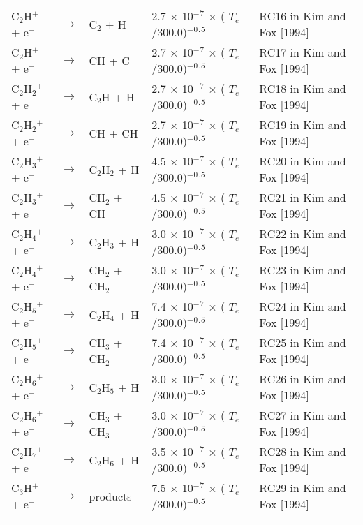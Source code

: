 \documentclass[10pt,a4paper]{jarticle}
\begin{document}
\begin{table}[htb]
{\begin{tabular}{lclll}
 C$_2$H$^+$  + e$^-$ & $\rightarrow$ & C$_2$   +  H       & 2.7 $\times$ 10$^-$$^7$ $\times$ ( $T_e$/300.0)$^-$$^0$$^.$$^5$ & RC16 in Kim and Fox [1994] \\
 C$_2$H$^+$  + e$^-$ & $\rightarrow$ & CH   +  C       & 2.7 $\times$ 10$^-$$^7$ $\times$ ( $T_e$/300.0)$^-$$^0$$^.$$^5$ & RC17 in Kim and Fox [1994] \\
 C$_2$H$_2$$^+$ + e$^-$ & $\rightarrow$ & C$_2$H  +  H       & 2.7 $\times$ 10$^-$$^7$ $\times$ ( $T_e$/300.0)$^-$$^0$$^.$$^5$ & RC18 in Kim and Fox [1994] \\
 C$_2$H$_2$$^+$ + e$^-$ & $\rightarrow$ & CH   +  CH      & 2.7 $\times$ 10$^-$$^7$ $\times$ ( $T_e$/300.0)$^-$$^0$$^.$$^5$ & RC19 in Kim and Fox [1994] \\
 C$_2$H$_3$$^+$ + e$^-$ & $\rightarrow$ & C$_2$H$_2$ +  H       & 4.5 $\times$ 10$^-$$^7$ $\times$ ( $T_e$/300.0)$^-$$^0$$^.$$^5$ & RC20 in Kim and Fox [1994] \\
 C$_2$H$_3$$^+$ + e$^-$ & $\rightarrow$ & CH$_2$  +  CH      & 4.5 $\times$ 10$^-$$^7$ $\times$ ( $T_e$/300.0)$^-$$^0$$^.$$^5$ & RC21 in Kim and Fox [1994] \\
 C$_2$H$_4$$^+$ + e$^-$ & $\rightarrow$ & C$_2$H$_3$ +  H       & 3.0 $\times$ 10$^-$$^7$ $\times$ ( $T_e$/300.0)$^-$$^0$$^.$$^5$ & RC22 in Kim and Fox [1994] \\
 C$_2$H$_4$$^+$ + e$^-$ & $\rightarrow$ & CH$_2$  +  CH$_2$     & 3.0 $\times$ 10$^-$$^7$ $\times$ ( $T_e$/300.0)$^-$$^0$$^.$$^5$ & RC23 in Kim and Fox [1994] \\
 C$_2$H$_5$$^+$ + e$^-$ & $\rightarrow$ & C$_2$H$_4$ +  H       & 7.4 $\times$ 10$^-$$^7$ $\times$ ( $T_e$/300.0)$^-$$^0$$^.$$^5$ & RC24 in Kim and Fox [1994] \\
 C$_2$H$_5$$^+$ + e$^-$ & $\rightarrow$ & CH$_3$  +  CH$_2$     & 7.4 $\times$ 10$^-$$^7$ $\times$ ( $T_e$/300.0)$^-$$^0$$^.$$^5$ & RC25 in Kim and Fox [1994] \\
 C$_2$H$_6$$^+$ + e$^-$ & $\rightarrow$ & C$_2$H$_5$ +  H       & 3.0 $\times$ 10$^-$$^7$ $\times$ ( $T_e$/300.0)$^-$$^0$$^.$$^5$ & RC26 in Kim and Fox [1994] \\
 C$_2$H$_6$$^+$ + e$^-$ & $\rightarrow$ & CH$_3$  +  CH$_3$     & 3.0 $\times$ 10$^-$$^7$ $\times$ ( $T_e$/300.0)$^-$$^0$$^.$$^5$ & RC27 in Kim and Fox [1994] \\
 C$_2$H$_7$$^+$ + e$^-$ & $\rightarrow$ & C$_2$H$_6$ +  H       & 3.5 $\times$ 10$^-$$^7$ $\times$ ( $T_e$/300.0)$^-$$^0$$^.$$^5$ & RC28 in Kim and Fox [1994] \\
 C$_3$H$^+$  + e$^-$ & $\rightarrow$ & products        & 7.5 $\times$ 10$^-$$^7$ $\times$ ( $T_e$/300.0)$^-$$^0$$^.$$^5$ & RC29 in Kim and Fox [1994] \\
$$
\end{tabular}}
\end{table}
\end{document}
